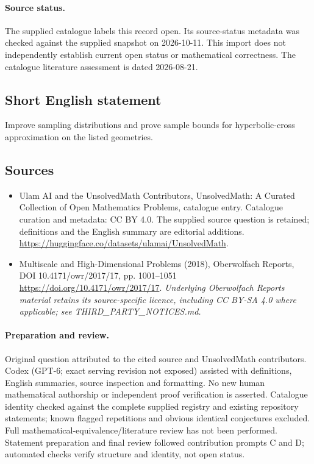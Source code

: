 \documentclass[11pt]{article}
\begin{document}
\paragraph{Source status.}
The supplied catalogue labels this record open. Its source-status metadata was checked against the supplied snapshot on 2026-10-11. This import does not independently establish current open status or mathematical correctness. The catalogue literature assessment is dated 2026-08-21.
\subsection{Short English statement}
Improve sampling distributions and prove sample bounds for hyperbolic-cross approximation on the listed geometries.
\subsection{Sources}
\begin{itemize}
\item[S1] Ulam AI and the UnsolvedMath Contributors, UnsolvedMath: A Curated Collection of Open Mathematics Problems, catalogue entry. Catalogue curation and metadata: CC BY 4.0. The supplied source question is retained; definitions and the English summary are editorial additions.
\url{https://huggingface.co/datasets/ulamai/UnsolvedMath}.
\item[S2] Multiscale and High-Dimensional Problems (2018), Oberwolfach Reports, DOI 10.4171/owr/2017/17, pp. 1001--1051
\url{https://doi.org/10.4171/owr/2017/17}.
\textit{Underlying Oberwolfach Reports material retains its source-specific licence, including CC BY-SA 4.0 where applicable; see THIRD\_PARTY\_NOTICES.md.}
\end{itemize}
\paragraph{Preparation and review.}
Original question attributed to the cited source and UnsolvedMath contributors. Codex (GPT-6; exact serving revision not exposed) assisted with definitions, English summaries, source inspection and formatting. No new human mathematical authorship or independent proof verification is asserted. Catalogue identity checked against the complete supplied registry and existing repository statements; known flagged repetitions and obvious identical conjectures excluded. Full mathematical-equivalence/literature review has not been performed. Statement preparation and final review followed contribution prompts C and D; automated checks verify structure and identity, not open status.
\label{end:statement}
\end{document}
